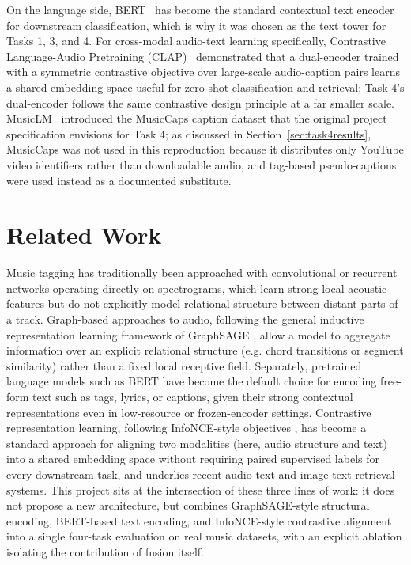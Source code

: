 \documentclass[conference]{IEEEtran}
\begin{document}
On the language side, BERT~\cite{bert} has become the standard contextual text encoder for downstream classification, which is why it was chosen as the text tower for Tasks 1, 3, and 4. For cross-modal audio-text learning specifically, Contrastive Language-Audio Pretraining (CLAP)~\cite{clap} demonstrated that a dual-encoder trained with a symmetric contrastive objective over large-scale audio-caption pairs learns a shared embedding space useful for zero-shot classification and retrieval; Task 4's dual-encoder follows the same contrastive design principle at a far smaller scale. MusicLM~\cite{musiclm} introduced the MusicCaps caption dataset that the original project specification envisions for Task 4; as discussed in Section~\ref{sec:task4results}, MusicCaps was not used in this reproduction because it distributes only YouTube video identifiers rather than downloadable audio, and tag-based pseudo-captions were used instead as a documented substitute.

\section{Related Work}
Music tagging has traditionally been approached with convolutional or recurrent networks operating directly on spectrograms, which learn strong local acoustic features but do not explicitly model relational structure between distant parts of a track. Graph-based approaches to audio, following the general inductive representation learning framework of GraphSAGE \cite{graphsage}, allow a model to aggregate information over an explicit relational structure (e.g. chord transitions or segment similarity) rather than a fixed local receptive field. Separately, pretrained language models such as BERT \cite{bert} have become the default choice for encoding free-form text such as tags, lyrics, or captions, given their strong contextual representations even in low-resource or frozen-encoder settings. Contrastive representation learning, following InfoNCE-style objectives \cite{infonce}, has become a standard approach for aligning two modalities (here, audio structure and text) into a shared embedding space without requiring paired supervised labels for every downstream task, and underlies recent audio-text and image-text retrieval systems. This project sits at the intersection of these three lines of work: it does not propose a new architecture, but combines GraphSAGE-style structural encoding, BERT-based text encoding, and InfoNCE-style contrastive alignment into a single four-task evaluation on real music datasets, with an explicit ablation isolating the contribution of fusion itself.
\end{document}
